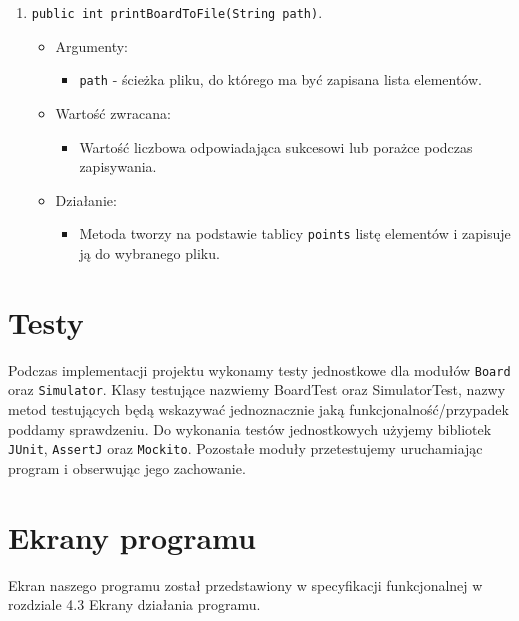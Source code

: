 \documentclass[a4paper,11pt, notitlepage ]{article}
\begin{document}
\begin{enumerate}
\item \verb+public int printBoardToFile(String path)+.
\begin{itemize}
\item Argumenty:
\begin{itemize}
\item \verb+path+ - ścieżka pliku, do którego ma być zapisana lista elementów.
\end{itemize}
\item Wartość zwracana:
\begin{itemize}
\item Wartość liczbowa odpowiadająca sukcesowi lub porażce podczas zapisywania.
\end{itemize}
\item Działanie:
\begin{itemize}
\item Metoda tworzy na podstawie tablicy \verb+points+ listę elementów i zapisuje ją do wybranego pliku.
\end{itemize}
\end{itemize}


\end{enumerate}


\section{Testy}
Podczas implementacji projektu wykonamy testy jednostkowe dla modułów \verb+Board+ oraz \verb+Simulator+. Klasy testujące nazwiemy BoardTest oraz SimulatorTest, nazwy metod testujących będą wskazywać jednoznacznie jaką funkcjonalność/przypadek poddamy sprawdzeniu. Do wykonania testów jednostkowych użyjemy bibliotek \verb+JUnit+, \verb+AssertJ+ oraz \verb+Mockito+.
Pozostałe moduły przetestujemy uruchamiając program i obserwując jego zachowanie.


\section{Ekrany programu}
Ekran naszego programu został przedstawiony w specyfikacji funkcjonalnej w rozdziale 4.3 Ekrany działania programu.
\end{document}
